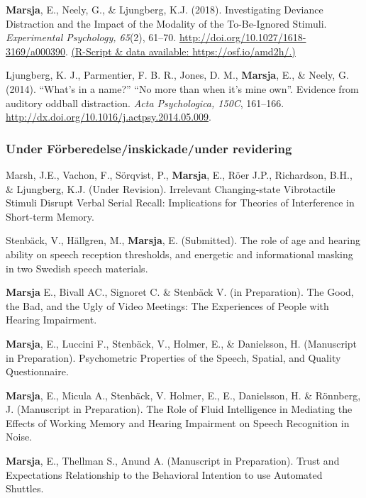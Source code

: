 \documentclass[]{article}
\begin{document}
\textbf{Marsja}, E., Neely, G., \& Ljungberg, K.J. (2018). Investigating
Deviance Distraction and the Impact of the Modality of the To-Be-Ignored
Stimuli. \emph{Experimental Psychology, 65}(2), 61--70.
\url{http://doi.org/10.1027/1618-3169/a000390}.
\href{https://osf.io/amd2h/}{(R-Script \& data available:
https://osf.io/amd2h/.)}

Ljungberg, K. J., Parmentier, F. B. R., Jones, D. M., \textbf{Marsja},
E., \& Neely, G. (2014). ``What's in a name?'' ``No more than when it's
mine own''. Evidence from auditory oddball distraction. \emph{Acta
Psychologica, 150C}, 161--166.
\href{http://doi.org/10.1027/1618-3169/a000390}{http://dx.doi.org/10.1016/j.actpsy.2014.05.009}.

\hypertarget{under-fuxf6rberedelseinskickadeunder-revidering}{%
\subsubsection{Under Förberedelse/inskickade/under
revidering}\label{under-fuxf6rberedelseinskickadeunder-revidering}}

Marsh, J.E., Vachon, F., Sörqvist, P., \textbf{Marsja}, E., Röer J.P.,
Richardson, B.H., \& Ljungberg, K.J. (Under Revision). Irrelevant
Changing-state Vibrotactile Stimuli Disrupt Verbal Serial Recall:
Implications for Theories of Interference in Short-term Memory.

Stenbäck, V., Hällgren, M., \textbf{Marsja}, E. (Submitted). The role of
age and hearing ability on speech reception thresholds, and energetic
and informational masking in two Swedish speech materials.

\textbf{Marsja} E., Bivall AC., Signoret C. \& Stenbäck V. (in
Preparation). The Good, the Bad, and the Ugly of Video Meetings: The
Experiences of People with Hearing Impairment.

\textbf{Marsja}, E., Luccini F., Stenbäck, V., Holmer, E., \&
Danielsson, H. (Manuscript in Preparation). Psychometric Properties of
the Speech, Spatial, and Quality Questionnaire.

\textbf{Marsja}, E., Micula A., Stenbäck, V. Holmer, E., E., Danielsson,
H. \& Rönnberg, J. (Manuscript in Preparation). The Role of Fluid
Intelligence in Mediating the Effects of Working Memory and Hearing
Impairment on Speech Recognition in Noise.

\textbf{Marsja}, E., Thellman S., Anund A. (Manuscript in Preparation).
Trust and Expectations Relationship to the Behavioral Intention to use
Automated Shuttles.
\end{document}
